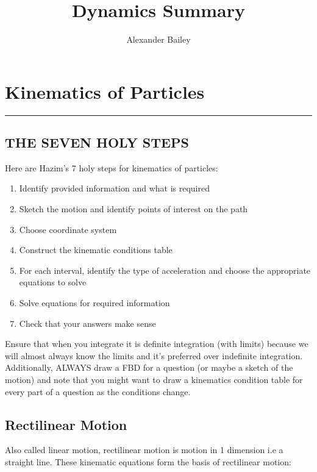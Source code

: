 \documentclass[a4paper, 12pt]{article}
\begin{document}
\title{Dynamics Summary}
\author{Alexander Bailey}

\maketitle

\section*{Kinematics of Particles}
\par\noindent\rule{0.4pt}{0.4pt}
\begin{center}
\subsection*{THE SEVEN HOLY STEPS}
\end{center}
Here are Hazim's 7 holy steps for kinematics of particles:
\begin{enumerate}
    \item Identify provided information and what is required 
    \item Sketch the motion and identify points of interest on the path 
    \item Choose coordinate system
    \item Construct the kinematic conditions table 
    \item For each interval, identify the type of acceleration and choose the appropriate equations to solve
    \item Solve equations for required information
    \item Check that your answers make sense
\end{enumerate}
\noindent
Ensure that when you integrate it is definite integration (with limits) because we will almost 
always know the limits and it's preferred over indefinite integration. Additionally, ALWAYS draw a FBD for a question
(or maybe a sketch of the motion) and note that you might want to draw a kinematics condition table for every
part of a question as the conditions change.

\begin{center}
\subsection*{Rectilinear Motion}
\end{center}
Also called linear motion, rectilinear motion is motion in 1 dimension i.e a straight line.
These kinematic equations form the basis of rectilinear motion:
\end{document}
